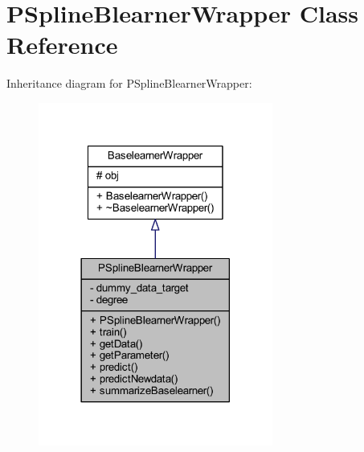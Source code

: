 \hypertarget{class_p_spline_blearner_wrapper}{}\section{P\+Spline\+Blearner\+Wrapper Class Reference}
\label{class_p_spline_blearner_wrapper}


Inheritance diagram for P\+Spline\+Blearner\+Wrapper\+:
\nopagebreak
\begin{figure}[H]
\begin{center}
\leavevmode
\includegraphics[width=218pt]{class_p_spline_blearner_wrapper__inherit__graph}
\end{center}
\end{figure}


